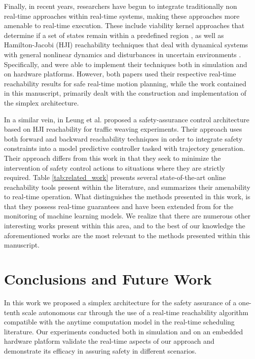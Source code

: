 \documentclass[manuscript,screen,review]{acmart}
\begin{document}
Finally, in recent years, researchers have begun to integrate traditionally non real-time approaches within real-time systems, making these approaches more amenable to real-time execution. These include viability kernel approaches that determine if a set of states remain within a predefined region \cite{Gurriet2018,Althoff2014}, as well as Hamilton-Jacobi (HJI) reachability techniques that deal with dynamical systems with general nonlinear dynamics and disturbances in uncertain environments \cite{Herbert2019,Bajcsy2018,Bajcsy2019Provably,bansal2020hamiltonjacobi,Fisac2017,Bansal2019,GATTAMI2011,Olivier2010,Chen2016,dhinakaran2017hybrid}. Specifically, \cite{Bajcsy2019Provably} and \cite{Althoff2014} were able to implement their techniques both in simulation and on hardware platforms. However, both papers used their respective real-time reachability results for safe real-time motion planning, while the work contained in this manuscript, primarily dealt with the construction and implementation of the simplex architecture. 

In a similar vein, in \cite{LeungReach2020} Leung et al. proposed a safety-assurance control architecture based on HJI reachability for traffic weaving experiments. Their approach uses both forward and backward reachability techniques in order to integrate safety constraints into a model predictive controller tasked with trajectory generation. Their approach differs from this work in that they seek to minimize the intervention of safety control actions to situations where they are strictly required. Table \ref{tab:related_work} presents several state-of-the-art online reachability tools present within the literature, and summarizes their amenability to real-time operation. What distinguishes the methods presented in this work, is that they possess real-time guarantees and have been extended from \cite{Johnson2016} for the monitoring of machine learning models. We realize that there are numerous other interesting works present within this area, and to the best of our knowledge the aforementioned works are the most relevant to the methods presented within this manuscript.   

\section{Conclusions and Future Work}

In this work we proposed a simplex architecture for the safety assurance of a one-tenth scale autonomous car through the use of a real-time reachability algorithm compatible with the anytime computation model in the real-time scheduling literature. Our experiments conducted both in simulation and on an embedded hardware platform validate the real-time aspects of our approach and demonstrate its efficacy in assuring safety in different scenarios.
\end{document}
